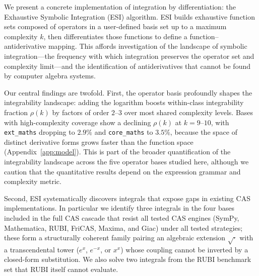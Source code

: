 \documentclass[preprint,12pt,authoryear]{elsarticle}
\newcommand{\rhok}{\rho(k)}
\newcommand{\codexadd}[1]{{\color{purple}#1}}
\newcommand{\hd}[1]{{\color{red}\textbf{[HD: #1]}}}
\begin{document}
\codexadd{We present a concrete implementation of integration by differentiation: the Exhaustive Symbolic Integration (ESI) algorithm.} ESI builds exhaustive function sets composed of operators in a user-defined basis set up to a maximum complexity $k$, then differentiates those functions to define a function--antiderivative mapping. This affords investigation of the landscape of symbolic integration---the frequency with which integration preserves the operator set and complexity limit---and the identification of antiderivatives that cannot be found by computer algebra systems.

Our central findings are twofold. First, the operator basis profoundly shapes the integrability landscape: adding the logarithm boosts within-class integrability fraction $\rhok$ by factors of order $2$--$3$ over most shared complexity levels. Bases with high-complexity coverage show a declining $\rhok$ at $k = 9$--$10$, with \texttt{ext\_maths} dropping to $2.9\%$ and \texttt{core\_maths} to $3.5\%$, because the space of distinct derivative forms grows faster than the function space (Appendix~\ref{app:model}). This is part of the broader quantification of the integrability landscape across the five operator bases studied here, although we caution that the quantitative results depend on the expression grammar and complexity metric.

Second, ESI systematically discovers integrals that expose gaps in existing CAS implementations.
In particular we identify
\codexadd{three integrals in the four bases included in the full CAS cascade that resist all tested CAS engines (SymPy, Mathematica, RUBI, FriCAS, Maxima, and Giac) under all tested strategies; these form a structurally coherent family pairing an algebraic extension $\sqrt{\cdot}$ with a transcendental tower ($e^x$, $e^{-x}$, or $x^x$) whose coupling cannot be inverted by a closed-form substitution. We also solve two integrals from the RUBI benchmark set that RUBI itself cannot evaluate.}
\end{document}
